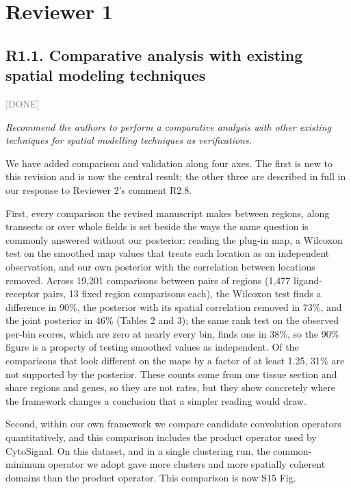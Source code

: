 \documentclass[11pt]{article}
\newcommand{\status}[1]{\textcolor{gray}{\small\textsf{[#1]}}}
\newenvironment{rev}{\begin{leftbar}\itshape\small}{\end{leftbar}}
\begin{document}
\section{Reviewer 1}

\subsection{R1.1. Comparative analysis with existing spatial modeling techniques} \status{DONE}

\begin{rev}
Recommend the authors to perform a comparative analysis with other existing techniques
for spatial modelling techniques as verifications.
\end{rev}

\noindent We have added comparison and validation along four axes. The first is new to this
revision and is now the central result; the other three are described in full in our response to
Reviewer 2's comment R2.8.

First, every comparison the revised manuscript makes between regions, along transects or over
whole fields is set beside the ways the same question is commonly answered without our
posterior: reading the plug-in map, a Wilcoxon test on the smoothed map values that treats
each location as an independent observation, and our own posterior with the correlation between
locations removed. Across 19,201 comparisons between pairs of regions (1,477 ligand-receptor
pairs, 13 fixed region comparisons each), the Wilcoxon test finds a difference in 90\%, the
posterior with its spatial correlation removed in 73\%, and the joint posterior in 46\% (Tables 2
and 3); the same rank test on the observed per-bin scores, which are zero at nearly every bin,
finds one in 38\%, so the 90\% figure is a property of testing smoothed values as independent. Of the comparisons that
look different on the maps by a factor of at least 1.25, 31\% are not supported by the posterior.
These counts come from one tissue section and share regions and genes, so they are not rates, but
they show concretely where the framework changes a conclusion that a simpler reading would draw.

Second, within our own framework we compare candidate convolution operators
quantitatively, and this comparison includes the product operator used by CytoSignal.
On this dataset, and in a single clustering run, the common-minimum operator we adopt gave
more clusters and more spatially coherent domains than the product operator. This comparison is
now S15 Fig.
\end{document}
